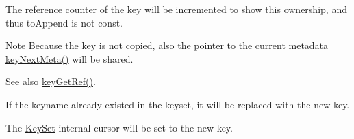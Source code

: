 The reference counter of the key will be incremented to show this ownership, and thus {\ttfamily to\+Append} is not const.

\begin{DoxyNote}{Note}
Because the key is not copied, also the pointer to the current metadata \hyperlink{group__keymeta_ga4c88342f580a4291455a801af71ce048}{key\+Next\+Meta()} will be shared.
\end{DoxyNote}
\begin{DoxySeeAlso}{See also}
\hyperlink{group__key_ga4aabc4272506dd63161db2bbb42de8ae}{key\+Get\+Ref()}.
\end{DoxySeeAlso}
If the keyname already existed in the keyset, it will be replaced with the new key.

The \hyperlink{classkdb_1_1KeySet}{Key\+Set} internal cursor will be set to the new key.

